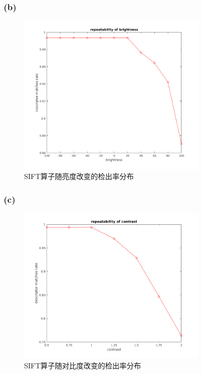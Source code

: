 \documentclass[a4paper, UTF8]{ctexrep}
\begin{document}
			\subsubsection{(b)}
				\begin{figure}[htbp!]
					\centering
					\includegraphics[width=0.8\textwidth]{hw1_fig16.png}
					\caption{SIFT算子随亮度改变的检出率分布}
				\end{figure}
			\clearpage
			\subsubsection{(c)}
				\begin{figure}[htbp!]
					\centering
					\includegraphics[width=0.8\textwidth]{hw1_fig17.png}
					\caption{SIFT算子随对比度改变的检出率分布}
				\end{figure}
			\clearpage
\end{document}
